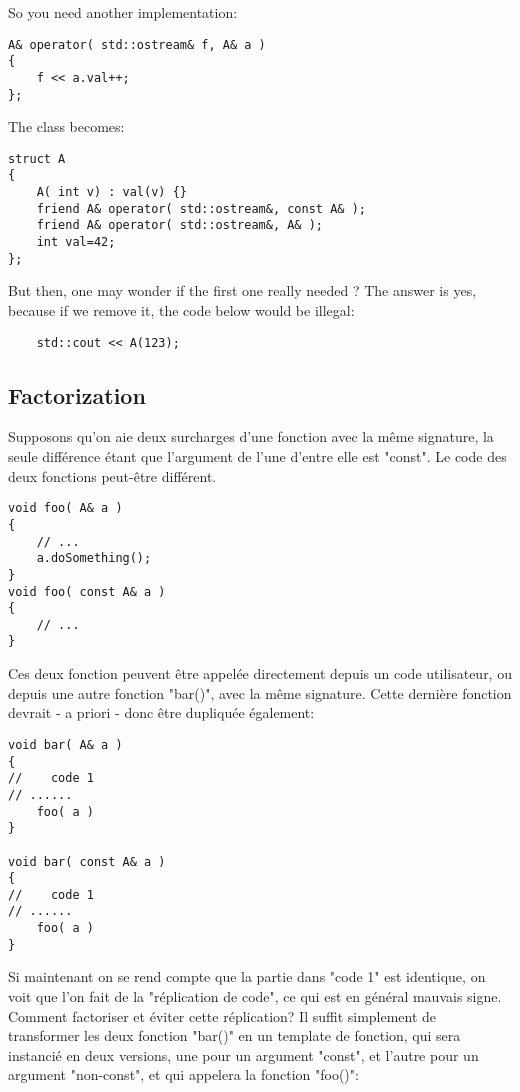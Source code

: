 \documentclass[11pt,a4paper]{article}
\begin{document}
So you need another implementation:
\begin{lstlisting}
A& operator( std::ostream& f, A& a )
{
	f << a.val++;
};
\end{lstlisting}

The class becomes:
\begin{lstlisting}
struct A
{
	A( int v) : val(v) {}
	friend A& operator( std::ostream&, const A& );
	friend A& operator( std::ostream&, A& );
	int val=42;
};
\end{lstlisting}

But then, one may wonder if the first one really needed ?
The answer is yes, because if we remove it, the code below would be illegal:
\begin{lstlisting}
	std::cout << A(123);
\end{lstlisting}


\subsection{Factorization}
\label{ssec:facto1}

Supposons qu'on aie deux surcharges d'une fonction avec la même signature, la seule différence étant que l'argument de l'une d'entre elle est "const".
Le code des deux fonctions peut-être différent.
\begin{lstlisting}
void foo( A& a )
{
	// ...
	a.doSomething();
}
void foo( const A& a )
{
	// ...
}
\end{lstlisting}

Ces deux fonction peuvent être appelée directement depuis un code utilisateur, ou depuis une autre fonction "bar()", avec la même signature.
Cette dernière fonction devrait - a priori - donc être dupliquée également:
\begin{lstlisting}
void bar( A& a )
{
//    code 1
// ......
	foo( a )
}

void bar( const A& a )
{
//    code 1
// ......
	foo( a )
}
\end{lstlisting}

Si maintenant on se rend compte que la partie dans "code 1" est identique, on voit que l'on fait de la "réplication de code", ce qui est en général mauvais signe.
Comment factoriser et éviter cette réplication?
Il suffit simplement de transformer les deux fonction "bar()" en un template de fonction, qui sera instancié en deux versions, une pour un argument "const", et l'autre pour un argument "non-const", et qui appelera la fonction "foo()":
\end{document}
